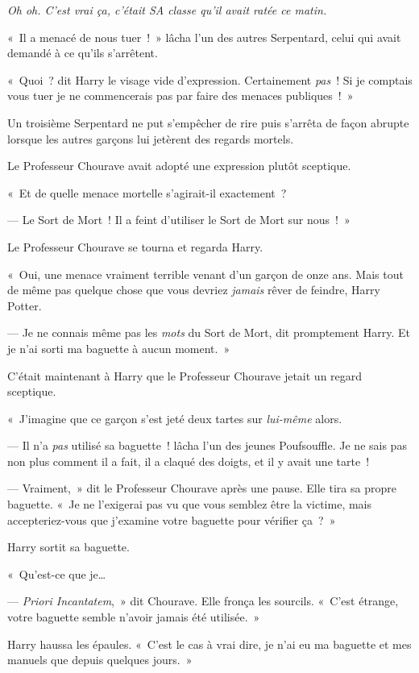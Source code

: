 \emph{Oh oh. C'est vrai ça, c'était SA classe qu'il avait ratée ce matin.}

«~Il a menacé de nous tuer~!~» lâcha l'un des autres Serpentard, celui qui avait demandé à ce qu'ils s'arrêtent.

«~Quoi~? dit Harry le visage vide d'expression. Certainement \emph{pas}~! Si je comptais vous tuer je ne commencerais pas par faire des menaces publiques~!~»

Un troisième Serpentard ne put s'empêcher de rire puis s'arrêta de façon abrupte lorsque les autres garçons lui jetèrent des regards mortels.

Le Professeur Chourave avait adopté une expression plutôt sceptique.

«~Et de quelle menace mortelle s'agirait-il exactement~?

--- Le Sort de Mort~! Il a feint d'utiliser le Sort de Mort sur nous~!~»

Le Professeur Chourave se tourna et regarda Harry.

«~Oui, une menace vraiment terrible venant d'un garçon de onze ans. Mais tout de même pas quelque chose que vous devriez \emph{jamais} rêver de feindre, Harry Potter.

--- Je ne connais même pas les \emph{mots} du Sort de Mort, dit promptement Harry. Et je n'ai sorti ma baguette à aucun moment.~»

C'était maintenant à Harry que le Professeur Chourave jetait un regard sceptique.

«~J'imagine que ce garçon s'est jeté deux tartes sur \emph{lui-même} alors.

--- Il n'a \emph{pas} utilisé sa baguette~! lâcha l'un des jeunes Poufsouffle. Je ne sais pas non plus comment il a fait, il a claqué des doigts, et il y avait une tarte~!

--- Vraiment,~» dit le Professeur Chourave après une pause. Elle tira sa propre baguette. «~Je ne l'exigerai pas vu que vous semblez être la victime, mais accepteriez-vous que j'examine votre baguette pour vérifier ça~?~»

Harry sortit sa baguette.

«~Qu'est-ce que je…

--- \emph{Priori Incantatem},~» dit Chourave. Elle fronça les sourcils. «~C'est étrange, votre baguette semble n'avoir jamais été utilisée.~»

Harry haussa les épaules. «~C'est le cas à vrai dire, je n'ai eu ma baguette et mes manuels que depuis quelques jours.~»

